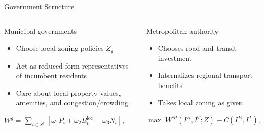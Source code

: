 \documentclass[10pt]{beamer}
\begin{document}
\begin{frame}{Government Structure}
\begin{columns}[T]
\begin{block}{Municipal governments}
\begin{itemize}
    \item Choose local zoning policies $Z_g$
    \item Act as reduced-form representatives of incumbent residents
    \item Care about local property values, amenities, and congestion/crowding\end{itemize}

 $
W^g
=
\sum_{i\in S^g}
\left[
\omega_1 P_i
+\omega_2 B_i^{\text{loc}}
-\omega_3 N_i
\right],
$
\end{block}

\begin{block}{Metropolitan authority}
\begin{itemize}
    \item Chooses road and transit investment
    \item Internalizes regional transport benefits
    \item Takes local zoning as given
\end{itemize}
$\max \; W^M(I^R,I^T; Z)-C(I^{R},I^{T}),
$
\end{block}
\end{columns}

\end{frame}
\end{document}
